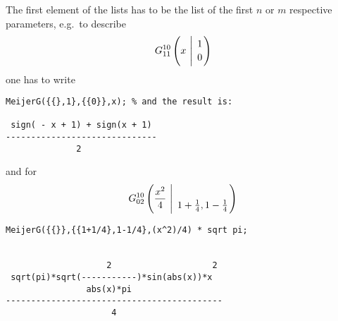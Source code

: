 The first element of the lists has to be the list of the
first $n$ or $m$ respective parameters, e.g.\ to describe 
\begin{displaymath}
G_{1 1}^{1 0} \left( x \  \Bigg\vert \  \genfrac{}{}{0pt}{}{1}{0} \right)
\end{displaymath}
one has to write 
\begin{verbatim}
MeijerG({{},1},{{0}},x); % and the result is:

 sign( - x + 1) + sign(x + 1)
------------------------------
              2
\end{verbatim}
and for
\begin{displaymath}
G_{0 2}^{1 0} \left( \frac{x^2}{4} \  \Bigg\vert \ \genfrac{}{}{0pt}{}{}{{1+ \frac{1}{4} },
{1-\frac{1}{4}}} \right)
\end{displaymath}
\begin{verbatim}
MeijerG({{}},{{1+1/4},1-1/4},(x^2)/4) * sqrt pi;


                    2                    2
 sqrt(pi)*sqrt(-----------)*sin(abs(x))*x
                abs(x)*pi
-------------------------------------------
                     4
\end{verbatim}


